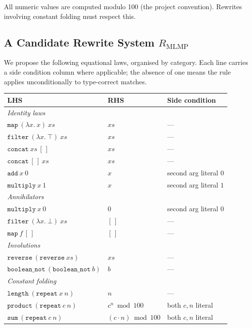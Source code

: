 \documentclass[11pt,a4paper]{article}
\begin{document}
All numeric values are computed modulo 100 (the project convention). Rewrites involving constant folding must respect this.

\subsection{A Candidate Rewrite System $R_{\text{MLMP}}$}\label{sec:rewrite-system}

We propose the following equational laws, organised by category. Each line carries a side condition column where applicable; the absence of one means the rule applies unconditionally to type-correct matches.

\begin{center}
\begin{tabular}{lll}
\toprule
LHS & RHS & Side condition \\
\midrule
\multicolumn{3}{l}{\textit{Identity laws}} \\
$\mathtt{map}\ (\lambda x.\ x)\ xs$ & $xs$ & --- \\
$\mathtt{filter}\ (\lambda x.\ \top)\ xs$ & $xs$ & --- \\
$\mathtt{concat}\ xs\ [\,]$ & $xs$ & --- \\
$\mathtt{concat}\ [\,]\ xs$ & $xs$ & --- \\
$\mathtt{add}\ x\ 0$ & $x$ & second arg literal $0$ \\
$\mathtt{multiply}\ x\ 1$ & $x$ & second arg literal $1$ \\
\midrule
\multicolumn{3}{l}{\textit{Annihilators}} \\
$\mathtt{multiply}\ x\ 0$ & $0$ & second arg literal $0$ \\
$\mathtt{filter}\ (\lambda x.\ \bot)\ xs$ & $[\,]$ & --- \\
$\mathtt{map}\ f\ [\,]$ & $[\,]$ & --- \\
\midrule
\multicolumn{3}{l}{\textit{Involutions}} \\
$\mathtt{reverse}\ (\mathtt{reverse}\ xs)$ & $xs$ & --- \\
$\mathtt{boolean\_not}\ (\mathtt{boolean\_not}\ b)$ & $b$ & --- \\
\midrule
\multicolumn{3}{l}{\textit{Constant folding}} \\
$\mathtt{length}\ (\mathtt{repeat}\ x\ n)$ & $n$ & --- \\
$\mathtt{product}\ (\mathtt{repeat}\ c\ n)$ & $c^n \bmod 100$ & both $c, n$ literal \\
$\mathtt{sum}\ (\mathtt{repeat}\ c\ n)$ & $(c \cdot n) \bmod 100$ & both $c, n$ literal \\

\end{tabular}
\end{center}
\end{document}
